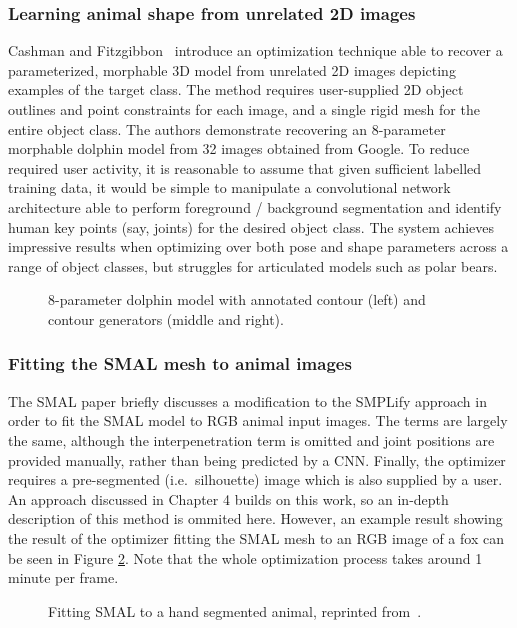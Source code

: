 \subsubsection{Learning animal shape from unrelated 2D images}
Cashman and Fitzgibbon~\cite{cashman2013shape} introduce an optimization technique able to recover a parameterized, morphable 3D model from unrelated 2D images depicting examples of the target class. The method requires user-supplied 2D object outlines and point constraints for each image, and a single rigid mesh for the entire object class. The authors demonstrate recovering an 8-parameter morphable dolphin model from 32 images obtained from Google. To reduce required user activity, it is reasonable to assume that given sufficient labelled training data, it would be simple to manipulate a convolutional network architecture able to perform foreground / background segmentation and identify human key points (say, joints) for the desired object class. The system achieves impressive results when optimizing over both pose and shape parameters across a range of object classes, but struggles for articulated models such as polar bears.

\begin{figure}[H] %
    \caption{8-parameter dolphin model with annotated contour (left) and contour generators (middle and right).}
    \label{fig:cashman_fitzgibbon}
\end{figure}

\subsubsection{Fitting the SMAL mesh to animal images}
The SMAL paper briefly discusses a modification to the SMPLify approach in order to fit the SMAL model to RGB animal input images. The terms are largely the same, although the interpenetration term is omitted and joint positions are provided manually, rather than being predicted by a CNN. Finally, the optimizer requires a pre-segmented (i.e.\ silhouette) image which is also supplied by a user. An approach discussed in Chapter 4 builds on this work, so an in-depth description of this method is ommited here. However, an example result showing the result of the optimizer fitting the SMAL mesh to an RGB image of a fox can be seen in Figure \ref{fig:smalify}. Note that the whole optimization process takes around 1 minute per frame.

\begin{figure}[H] %
    \caption{Fitting SMAL to a hand segmented animal, reprinted from~\cite{zuffi2017menagerie}.}
    \label{fig:smalify}
\end{figure}

